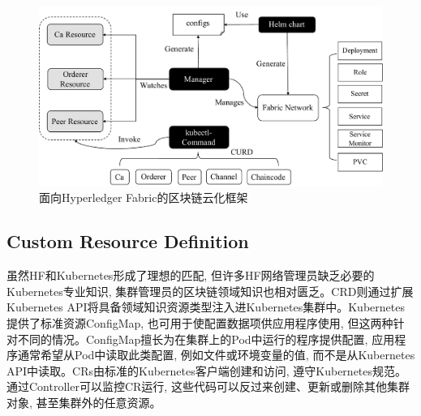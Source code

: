 \begin{figure}[h] %
    \centering %
    \includegraphics[width=1.0\textwidth]{FIGs/chapter4/framework.pdf} %
    \caption{面向Hyperledger Fabric的区块链云化框架} %
    \label{framework} %
\end{figure}%

\subsection{Custom Resource Definition}\label{section: Custom_Resource_Definition}

虽然HF和Kubernetes形成了理想的匹配, 但许多HF网络管理员缺乏必要的Kubernetes专业知识, 集群管理员的区块链领域知识也相对匮乏。CRD则通过扩展Kubernetes API将具备领域知识资源类型注入进Kubernetes集群中。Kubernetes提供了标准资源ConfigMap, 也可用于使配置数据项供应用程序使用, 但这两种针对不同的情况。ConfigMap擅长为在集群上的Pod中运行的程序提供配置, 应用程序通常希望从Pod中读取此类配置, 例如文件或环境变量的值, 而不是从Kubernetes API中读取。CRs由标准的Kubernetes客户端创建和访问, 遵守Kubernetes规范。通过Controller可以监控CR运行, 这些代码可以反过来创建、更新或删除其他集群对象, 甚至集群外的任意资源。


